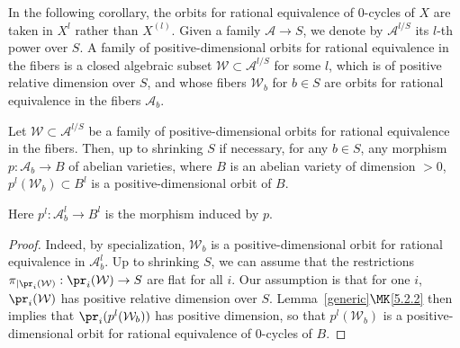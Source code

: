 In the following corollary, the orbits for rational equivalence of $0$-cycles of $X$ are taken in $X^l$ rather than $X^{(l)}$. Given a family $\mathcal{A}\rightarrow S$, we denote by $\mathcal{A}^{l/S}$ its $l$-th power over $S$. A family of positive-dimensional orbits for rational equivalence in the fibers is a closed algebraic subset $\mathcal{W}\subset \mathcal{A}^{l/S}$ for some $l$, which is of positive relative dimension over $S$, and whose fibers $\mathcal{W}_b$ for $b\in S$ are orbits for rational equivalence in the fibers $\mathcal{A}_b$.

\begin{coro}\label{coropourtheoorbitgen}
Let $\mathcal{W}\subset \mathcal{A}^{l/S}$ be a family of positive-dimensional orbits for rational equivalence in the fibers. Then, up to shrinking $S$ if necessary, for any $b\in S$, any morphism $p: \mathcal{A}_b\rightarrow B$ of abelian varieties, where $B$ is an abelian variety of dimension $>0$, $p^l(\mathcal{W}_b)\subset B^l$ is a positive-dimensional orbit of $B$.
\end{coro}

Here $p^l:\mathcal{A}_b^l\rightarrow B^l$ is the morphism induced by $p$.

\begin{proof}
Indeed, by specialization, $\mathcal{W}_b $ is a positive-dimensional
orbit for rational equivalence in $\mathcal{A}_b^{l}$. Up to shrinking $S$, we can assume that the restrictions $\pi_{\mid \pr_i(\mathcal{W})}: \pr_i(\mathcal{W})\rightarrow S$ are flat for all $i$. Our assumption is that for one $i$, $\pr_i(\mathcal{W})$ has positive relative dimension over $S$. Lemma~\ref{generic}$\MK$\eqref{5.2.2} then implies that $\pr_i(p^l(\mathcal{W}_b))$ has positive dimension, so that $p^l(\mathcal{W}_b)$ is a positive-dimensional orbit for rational equivalence of $0$-cycles of $B$.
\end{proof}

